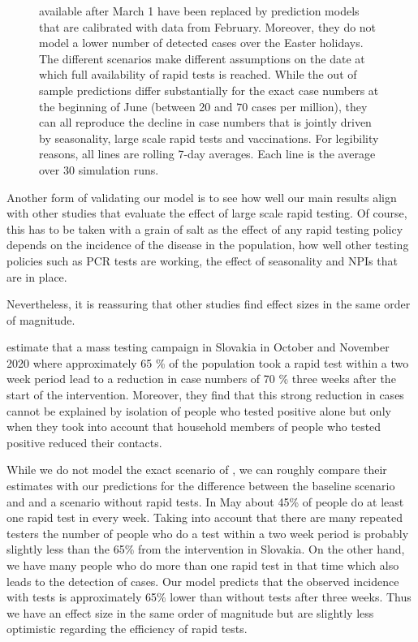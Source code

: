 \begin{figure}[ht]
{  available after March 1 have been replaced by prediction models that are calibrated
  with data from February. Moreover, they do not model a lower number of detected cases
  over the Easter holidays. The different scenarios make different assumptions on the
  date at which full availability of rapid tests is reached. While the out of sample
  predictions differ substantially for the exact case numbers at the beginning of June
  (between 20 and 70 cases per million), they can all reproduce the decline in case
  numbers that is jointly driven by seasonality, large scale rapid tests and
  vaccinations. For legibility reasons, all lines are rolling 7-day averages. Each line
  is the average over 30 simulation runs.}
\end{figure}

Another form of validating our model is to see how well our main results align with
other studies that evaluate the effect of large scale rapid testing. Of course, this
has to be taken with a grain of salt as the effect of any rapid testing policy depends
on the incidence of the disease in the population, how well other testing policies
such as PCR tests are working, the effect of seasonality and NPIs that are in place.

Nevertheless, it is reassuring that other studies find effect sizes in the same order
of magnitude.

\citet{Pavelka2021} estimate that a mass testing campaign in Slovakia in October and
November 2020 where approximately 65 \% of the population took a rapid test within a two
week period lead to a reduction in case numbers of 70 \% three weeks after the start
of the intervention. Moreover, they find that this strong reduction in
cases cannot be explained by isolation of people who tested positive alone but only when
they took into account that household members of people who tested positive reduced
their contacts.

While we do not model the exact scenario of \citet{Pavelka2021}, we can roughly compare
their estimates with our predictions for the difference between the baseline scenario
and and a scenario without rapid tests. In May about 45\% of people do
at least one rapid test in every week. Taking into account that there are many repeated
testers the number of people who do a test within a two week period is probably
slightly less than the 65\% from the intervention in Slovakia. On the other hand, we
have many people who do more than one rapid test in that time which also leads to the
detection of cases. Our model predicts that the observed incidence with tests is
approximately 65\% lower than without tests after three weeks.
Thus we have an effect size in the same order of magnitude but are slightly
less optimistic regarding the efficiency of rapid tests.

